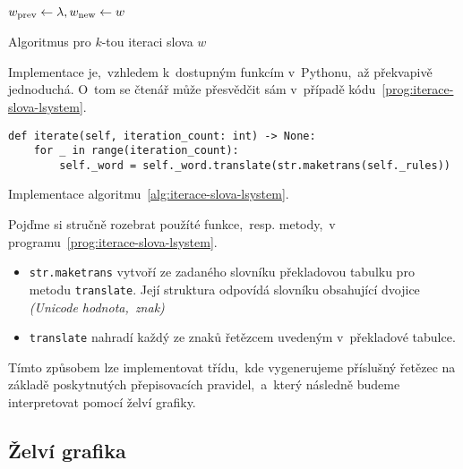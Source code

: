 \begin{algorithm}[h]
    $w_{\textup{prev}}\gets\lambda,w_{\textup{new}}\gets w$\;
    \;
    \caption{Algoritmus pro $k$-tou iteraci slova $w$}
    \label{alg:iterace-slova-lsystem}
\end{algorithm}
Implementace je,~vzhledem k~dostupným funkcím v~Pythonu,~až překvapivě jednoduchá. O~tom se čtenář může přesvědčit sám v~případě kódu~\ref{prog:iterace-slova-lsystem}.
\begin{program}[h]
\begin{lstlisting}[style=python]
def iterate(self, iteration_count: int) -> None:
    for _ in range(iteration_count):
        self._word = self._word.translate(str.maketrans(self._rules))
\end{lstlisting}
    \caption{Implementace algoritmu~\ref{alg:iterace-slova-lsystem}.}
    \label{prog:iterace-slova-lsystem}
\end{program}
Pojďme si stručně rozebrat použíté funkce,~resp. metody,~v programu~\ref{prog:iterace-slova-lsystem}.
\begin{itemize}
    \item \texttt{str.maketrans} vytvoří ze zadaného slovníku překladovou tabulku pro metodu \texttt{translate}. Její struktura odpovídá slovníku obsahující dvojice \emph{(Unicode hodnota,~znak)}
    \item \texttt{translate} nahradí každý ze znaků řetězcem uvedeným v~překladové tabulce.
\end{itemize}
Tímto způsobem lze implementovat třídu,~kde vygenerujeme příslušný řetězec na základě poskytnutých přepisovacích pravidel,~a~který následně budeme interpretovat pomocí želví grafiky.

\subsection{Želví grafika}\label{subsec:implementace-zelvi-grafiky}

